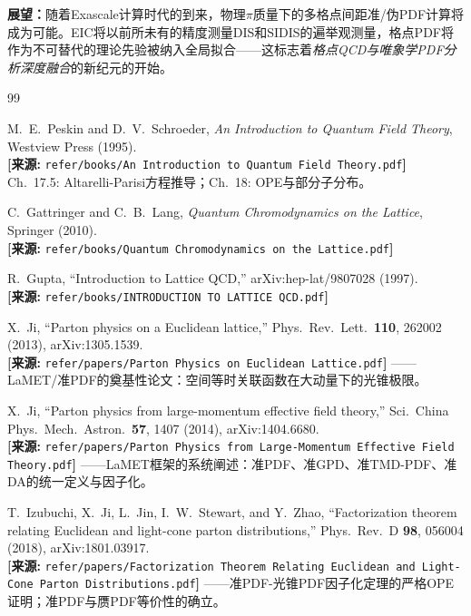 \documentclass[12pt,a4paper]{ctexart}
\theoremstyle{definition}
\begin{document}
\textbf{展望：}随着Exascale计算时代的到来，物理$\pi$质量下的多格点间距准/伪PDF计算将成为可能。EIC将以前所未有的精度测量DIS和SIDIS的遍举观测量，格点PDF将作为不可替代的理论先验被纳入全局拟合——这标志着\emph{格点QCD与唯象学PDF分析深度融合}的新纪元的开始。

\begin{thebibliography}{99}

M.~E.~Peskin and D.~V.~Schroeder,
\textit{An Introduction to Quantum Field Theory}, Westview Press (1995).
\\\textbf{[来源:} \texttt{refer/books/An Introduction to Quantum Field Theory.pdf}\textbf{]}
\\Ch.~17.5: Altarelli-Parisi方程推导；Ch.~18: OPE与部分子分布。

C.~Gattringer and C.~B.~Lang,
\textit{Quantum Chromodynamics on the Lattice}, Springer (2010).
\\\textbf{[来源:} \texttt{refer/books/Quantum Chromodynamics on the Lattice.pdf}\textbf{]}

R.~Gupta, ``Introduction to Lattice QCD,'' arXiv:hep-lat/9807028 (1997).
\\\textbf{[来源:} \texttt{refer/books/INTRODUCTION TO LATTICE QCD.pdf}\textbf{]}

X.~Ji, ``Parton physics on a Euclidean lattice,''
Phys.\ Rev.\ Lett.\ \textbf{110}, 262002 (2013), arXiv:1305.1539.
\\\textbf{[来源:} \texttt{refer/papers/Parton Physics on Euclidean Lattice.pdf}\textbf{]}
——LaMET/准PDF的奠基性论文：空间等时关联函数在大动量下的光锥极限。

X.~Ji, ``Parton physics from large-momentum effective field theory,''
Sci.\ China Phys.\ Mech.\ Astron.\ \textbf{57}, 1407 (2014), arXiv:1404.6680.
\\\textbf{[来源:} \texttt{refer/papers/Parton Physics from Large-Momentum Effective Field Theory.pdf}\textbf{]}
——LaMET框架的系统阐述：准PDF、准GPD、准TMD-PDF、准DA的统一定义与因子化。

T.~Izubuchi, X.~Ji, L.~Jin, I.~W.~Stewart, and Y.~Zhao,
``Factorization theorem relating Euclidean and light-cone parton distributions,''
Phys.\ Rev.\ D \textbf{98}, 056004 (2018), arXiv:1801.03917.
\\\textbf{[来源:} \texttt{refer/papers/Factorization Theorem Relating Euclidean and Light-Cone Parton Distributions.pdf}\textbf{]}
——准PDF-光锥PDF因子化定理的严格OPE证明；准PDF与赝PDF等价性的确立。


\end{thebibliography}
\end{document}
